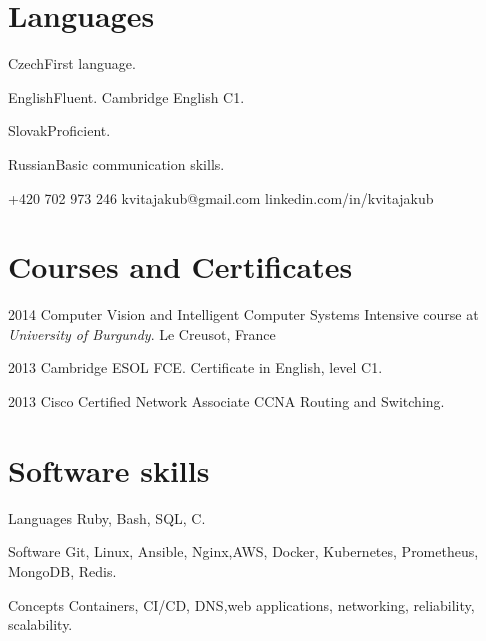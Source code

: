 \documentclass{tccv}
\begin{document}
\section{Languages}

\begin{factlist}
	\item{Czech}{First language.}
	\item{English}{Fluent. Cambridge English C1.}
	\item{Slovak}{Proficient.}
	\item{Russian}{Basic communication skills.}
\end{factlist}

{+420 702 973 246}
{kvitajakub@gmail.com}
{linkedin.com/in/kvitajakub}

\section{Courses and Certificates}

\begin{yearlist}
	
	\item{2014}
	{Computer Vision and Intelligent Computer Systems}
	{Intensive course at \emph{University of Burgundy}. Le Creusot, France}
	
	\item{2013}
	{Cambridge ESOL FCE.}
	{Certificate in English, level C1.}
	
	\item{2013}
	{Cisco Certified Network Associate}
	{CCNA Routing and Switching.}
	
\end{yearlist}

\section{Software skills}

\begin{factlist}
	
	\item{Languages}
	{Ruby, Bash, SQL, C.}
	
	\item{Software}
	{Git, Linux, Ansible, Nginx,\newline AWS, Docker, Kubernetes, Prometheus, MongoDB, Redis.}
	
	\item{Concepts}
	{Containers, CI/CD, DNS,\newline web applications, networking, reliability, scalability.}
	
\end{factlist}
\end{document}
